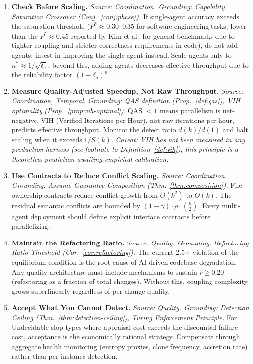 \documentclass[11pt, a4paper]{googledeepmind}
\begin{document}
\begin{enumerate}[label=\textbf{P\arabic*.}, leftmargin=3em, resume]
\item \textbf{Check Before Scaling.}
\emph{Source: Coordination. Grounding: Capability Saturation Crossover (Conj.~\ref{conj:phase}).}
If single-agent accuracy exceeds the saturation threshold ($P^* \approx 0.30$--$0.35$ for software engineering tasks, lower than the $P^* \approx 0.45$ reported by Kim et al.\ for general benchmarks due to tighter coupling and stricter correctness requirements in code), do not add agents; invest in improving the single agent instead. Scale agents only to $n^* \approx 1/\sqrt{\delta_a}$; beyond this, adding agents decreases effective throughput due to the reliability factor $(1-\delta_a)^n$.

\item \textbf{Measure Quality-Adjusted Speedup, Not Raw Throughput.}
\emph{Source: Coordination, Temporal. Grounding: QAS definition (Prop.~\ref{def:qas}), VIH optimality (Prop.~\ref{prop:vih-optimal}).}
QAS $< 1$ means parallelism is net-negative. VIH (Verified Iterations per Hour), not raw iterations per hour, predicts effective throughput. Monitor the defect ratio $d(k)/d(1)$ and halt scaling when it exceeds $1/S(k)$. \emph{Caveat: VIH has not been measured in any production harness (see footnote to Definition~\ref{def:vih}); this principle is a theoretical prediction awaiting empirical calibration.}

\item \textbf{Use Contracts to Reduce Conflict Scaling.}
\emph{Source: Coordination. Grounding: Assume-Guarantee Composition (Thm.~\ref{thm:composition}).}
File-ownership contracts reduce conflict growth from $O(k^2)$ to $O(k)$. The residual semantic conflicts are bounded by $(1-\gamma) \cdot \rho \cdot \binom{k}{2}$. Every multi-agent deployment should define explicit interface contracts before parallelizing.

\item \textbf{Maintain the Refactoring Ratio.}
\emph{Source: Quality. Grounding: Refactoring Ratio Threshold (Cor.~\ref{cor:refactoring}).}
The current 2.5$\times$ violation of the equilibrium condition is the root cause of AI-driven codebase degradation. Any quality architecture must include mechanisms to sustain $r \geq 0.20$ (refactoring as a fraction of total changes). Without this, coupling complexity grows superlinearly regardless of per-change quality.

\item \textbf{Accept What You Cannot Detect.}
\emph{Source: Quality. Grounding: Detection Ceiling (Thm.~\ref{thm:detection-ceiling}), Turing Enforcement Principle.}
For Undecidable slop types where appraisal cost exceeds the discounted failure cost, acceptance is the economically rational strategy. Compensate through aggregate health monitoring (entropy proxies, clone frequency, accretion rate) rather than per-instance detection.


\end{enumerate}
\end{document}
